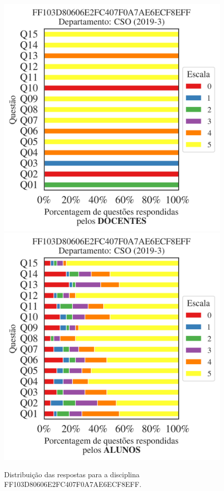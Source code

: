 \documentclass[a4paper,10pt]{article}
\begin{document}
\begin{figure}[h]
\centering
\includegraphics[width=0.485\linewidth]{analise_disciplina_departamento_CSO_FF103D80606E2FC407F0A7AE6ECF8EFF_docentes.png}
\includegraphics[width=0.485\linewidth]{analise_disciplina_departamento_CSO_FF103D80606E2FC407F0A7AE6ECF8EFF_alunos.png}
\caption{\label{fig:analise_geral_departamento}                Distribuição das respostas para a disciplina FF103D80606E2FC407F0A7AE6ECF8EFF. }
\end{figure}
\end{document}
